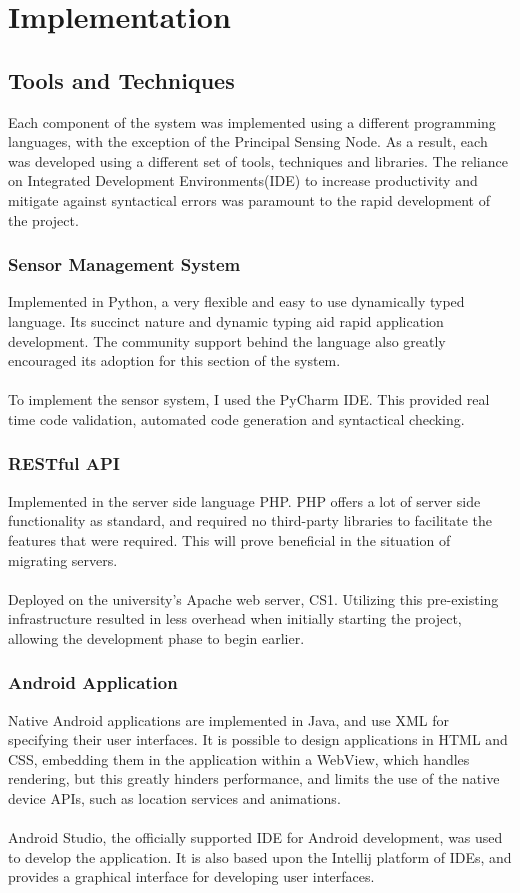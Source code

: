 \documentclass{article}
\begin{document}
\section{Implementation	}

\subsection{Tools and Techniques}
Each component of the system was implemented using a different programming languages, with the exception of the Principal Sensing Node. As a result, each was developed using a different set of tools, techniques and libraries. The reliance on Integrated Development Environments(IDE) to increase productivity and mitigate against syntactical errors was paramount to the rapid development of the project. 

\subsubsection{Sensor Management System}
Implemented in Python, a very flexible and easy to use dynamically typed language. Its succinct nature and dynamic typing aid rapid application development. The community support behind the language also greatly encouraged its adoption for this section of the system. \\\\ To implement the sensor system, I used the PyCharm IDE. This provided real time code validation, automated code generation and syntactical checking.

\subsubsection{RESTful API}
Implemented in the server side language PHP. PHP offers a lot of server side functionality as standard, and required no third-party libraries to facilitate the features that were required. This will prove beneficial in the situation of migrating servers. \\\\ Deployed on the university’s Apache web server, CS1. Utilizing this pre-existing infrastructure resulted in less overhead when initially starting the project, allowing the development phase to begin earlier. 

\subsubsection{Android Application}
Native Android applications are implemented in Java, and use XML for specifying their user interfaces. It is possible to design applications in HTML and CSS, embedding them in the application within a WebView, which handles rendering, but this greatly hinders performance, and limits the use of the native device APIs, such as location services and animations. \\\\ Android Studio, the officially supported IDE for Android development, was used to develop the application. It is also based upon the Intellij platform of IDEs, and provides a graphical interface for developing user interfaces.  
\end{document}
